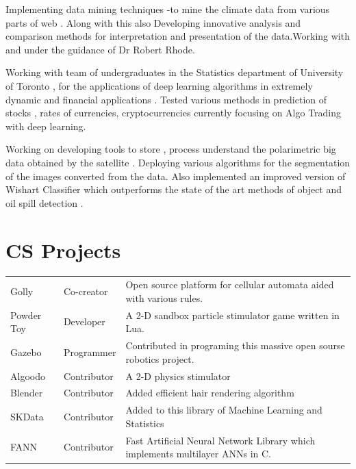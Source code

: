 \documentclass[]{deedy-resume-openfont}
\begin{document}
Implementing  data mining techniques -to mine the climate data from various parts of web . Along with this also Developing innovative analysis and comparison methods for interpretation and presentation of the data.Working with and under the guidance of Dr Robert Rhode.
\sectionsep

Working with team of  undergraduates in the Statistics department of University of Toronto , for the applications of deep learning algorithms in extremely dynamic and financial applications . Tested various methods in prediction of stocks , rates of currencies, cryptocurrencies currently focusing on Algo Trading with deep learning.
\sectionsep

Working on developing tools to store , process understand the polarimetric big data obtained by the satellite . Deploying various algorithms for the segmentation of the images converted from the data. Also implemented an improved version of Wishart Classifier which outperforms the state of the art methods of object and oil spill detection .
\sectionsep




\section{CS Projects} 
\hline
\vspace{\topsep}
\begin{tabular}{lll}

Golly	     & Co-creator & Open source platform for cellular automata aided with various rules.\\
Powder Toy	     & Developer  & A 2-D sandbox particle stimulator game written in Lua.\\

Gazebo	     & Programmer& Contributed in programing this massive open sourse robotics project.\\
Algoodo	     & Contributor& A 2-D physics stimulator \\
Blender     & Contributor  & Added efficient hair rendering algorithm  \\
SKData     & Contributor& Added to this library of Machine Learning and Statistics  \\
FANN & Contributor & Fast Artificial Neural Network Library which implements multilayer ANNs in C.\\
\end{tabular}
\sectionsep
\end{document}
